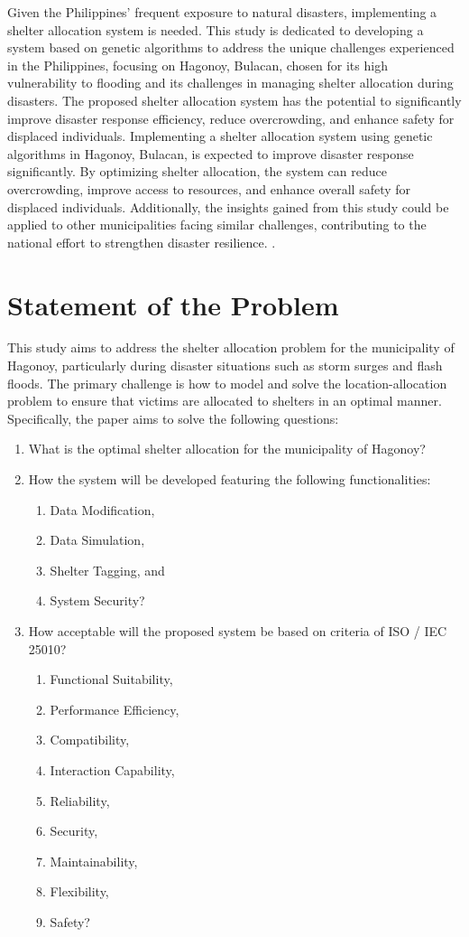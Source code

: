 Given the Philippines' frequent exposure to natural disasters, implementing a shelter allocation system is needed. This study is dedicated to developing a system based on genetic algorithms to address the unique challenges experienced in the Philippines, focusing on Hagonoy, Bulacan, chosen for its high vulnerability to flooding and its challenges in managing shelter allocation during disasters. The proposed shelter allocation system has the potential to significantly improve disaster response efficiency, reduce overcrowding, and enhance safety for displaced individuals. Implementing a shelter allocation system using genetic algorithms in Hagonoy, Bulacan, is expected to improve disaster response significantly. By optimizing shelter allocation, the system can reduce overcrowding, improve access to resources, and enhance overall safety for displaced individuals. Additionally, the insights gained from this study could be applied to other municipalities facing similar challenges, contributing to the national effort to strengthen disaster resilience. 
\nocite{*}.

\section{Statement of the Problem}
This study aims to address the shelter allocation problem for the municipality of Hagonoy, particularly during disaster situations such as storm surges and flash floods. The primary challenge is how to model and solve the location-allocation problem to ensure that victims are allocated to shelters in an optimal manner. Specifically, the paper aims to solve the following questions:

\begin{enumerate}
	\item What is the optimal shelter allocation for the municipality of Hagonoy?
	\item How the system will be developed featuring the following functionalities:
	\begin{enumerate}
		\item Data Modification,
		\item Data Simulation,
		\item Shelter Tagging, and
		\item System Security?
	\end{enumerate}
	\item How acceptable will the proposed system be based on criteria of ISO / IEC 25010?
	\begin{enumerate}
		\item Functional Suitability,
		\item Performance Efficiency,
		\item Compatibility,
		\item Interaction Capability,
		\item Reliability,
		\item Security,
		\item Maintainability,
		\item Flexibility,
		\item Safety?
	\end{enumerate}
\end{enumerate}

